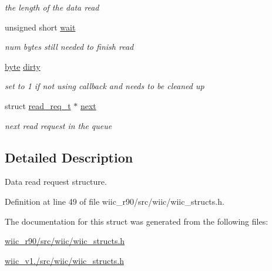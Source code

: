 \begin{DoxyCompactItemize}
\begin{DoxyCompactList}\small\item\em the length of the data read \end{DoxyCompactList}\item 
\hypertarget{structread__req__t_aa0e807ee1e193efc139b48c2acd8bdf7}{unsigned short \hyperlink{structread__req__t_aa0e807ee1e193efc139b48c2acd8bdf7}{wait}}\label{structread__req__t_aa0e807ee1e193efc139b48c2acd8bdf7}

\begin{DoxyCompactList}\small\item\em num bytes still needed to finish read \end{DoxyCompactList}\item 
\hypertarget{structread__req__t_a8ac72c3b91e371aaeadb4d01ed0fb303}{\hyperlink{wiic__r90_2src_2wiic_2wiic__macros_8h_a0c8186d9b9b7880309c27230bbb5e69d}{byte} \hyperlink{structread__req__t_a8ac72c3b91e371aaeadb4d01ed0fb303}{dirty}}\label{structread__req__t_a8ac72c3b91e371aaeadb4d01ed0fb303}

\begin{DoxyCompactList}\small\item\em set to 1 if not using callback and needs to be cleaned up \end{DoxyCompactList}\item 
\hypertarget{structread__req__t_a307d53fd0a6ea65b4a2ed25a0ddd4006}{struct \hyperlink{structread__req__t}{read\-\_\-req\-\_\-t} $\ast$ \hyperlink{structread__req__t_a307d53fd0a6ea65b4a2ed25a0ddd4006}{next}}\label{structread__req__t_a307d53fd0a6ea65b4a2ed25a0ddd4006}

\begin{DoxyCompactList}\small\item\em next read request in the queue \end{DoxyCompactList}\end{DoxyCompactItemize}


\subsection{Detailed Description}
Data read request structure. 

Definition at line 49 of file wiic\-\_\-r90/src/wiic/wiic\-\_\-structs.\-h.



The documentation for this struct was generated from the following files\-:\begin{DoxyCompactItemize}
\item 
\hyperlink{wiic__r90_2src_2wiic_2wiic__structs_8h}{wiic\-\_\-r90/src/wiic/wiic\-\_\-structs.\-h}\item 
\hyperlink{wiic__v1_81_2src_2wiic_2wiic__structs_8h}{wiic\-\_\-v1./src/wiic/wiic\-\_\-structs.\-h}\end{DoxyCompactItemize}
